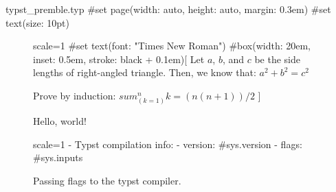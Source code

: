 \documentclass{article}
\begin{document}
\begin{filecontents*}[overwrite]{typst_premble.typ}
#set page(width: auto, height: auto, margin: 0.3em)
#set text(size: 10pt)
\end{filecontents*}

\begin{figure}[h]
    \centering
    \begin{typst}{scale=1}
    #set text(font: "Times New Roman")
    #box(width: 20em, inset: 0.5em, stroke: black + 0.1em)[
        Let $a$, $b$, and $c$ be the side
        lengths of right-angled triangle.
        Then, we know that:
        $ a^2 + b^2 = c^2 $

        Prove by induction:
        $ sum_(k=1)^n k = (n(n+1)) / 2 $
    ]
    \end{typst}
    \caption{Hello, world!}
\end{figure}

\renewcommand{\typstflags}{--input a=b}
\begin{figure}[h]
    \centering
    \begin{typst}{scale=1}
        - Typst compilation info:
            - version: #sys.version
            - flags: #sys.inputs
    \end{typst}
    \caption{Passing flags to the typst compiler.}
\end{figure}
\end{document}
